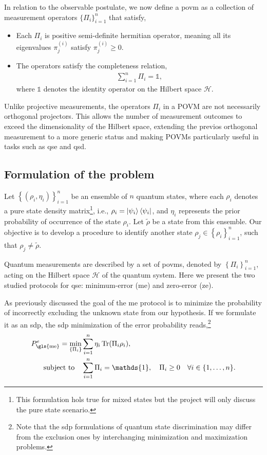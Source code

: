 \documentclass[12pt,letterpaper]{article}
\DeclareMathOperator{\tr}{Tr}
\begin{document}
In relation to the observable postulate, we now define a \gls{povm} as a collection of measurement operators $\{\Pi_i\}_{i=1}^n$ that satisfy,
\begin{itemize}
	\item Each $\Pi_i$ is positive semi-definite hermitian operator, meaning all its eigenvalues $\pi_j^{(i)}$ satisfy $\pi_j^{(i)} \geq 0$.
	\item The operators satisfy the completeness relation,
\begin{align*}
	\sum_{i=1}^n \Pi_i = \mathds{1},
\end{align*}
where $\mathds{1}$ denotes the identity operator on the Hilbert space $\mathcal{H}$.
\end{itemize}

Unlike projective measurements, the operators $\Pi_i$ in a POVM are not necessarily orthogonal projectors. This allows the number of measurement outcomes to exceed the dimensionality of the Hilbert space, extending the previos orthogonal measurement to a more generic status and making POVMs particularly useful in tasks such as \gls{qse} and \gls{qsd}.

\subsection{Formulation of the problem}\label{sectionFormulationOfTheProblem}

\hspace{20pt}Let $\left\{(\rho_i, \eta_i)\right\}_{i=1}^n$ be an ensemble of $n$ quantum states, where each $\rho_i$ denotes a pure state density matrix\footnote{This formulation hols true for mixed states but the project will only discuss the pure state scenario.}, i.e., $\rho_i = \ket{\psi_i}\bra{\psi_i}$, and $\eta_i$ represents the prior probability of occurrence of the state $\rho_i$. Let $\tilde{\rho}$ be a state from this ensemble. Our objective is to develop a procedure to identify another state $\rho_j \in \left\{\rho_i\right\}_{i=1}^n$, such that $\rho_j \neq \tilde{\rho}$.

Quantum measurements are described by a set of \glspl{povm}, denoted by $\left\{\Pi_i\right\}_{i=1}^n$, acting on the Hilbert space $\mathcal{H}$ of the quantum system. Here we present the two studied protocols for \gls{qse}: minimum-error (\gls{me}) and zero-error (\gls{ze}).

As previously discussed the goal of the \gls{me} protocol is to minimize the probability of incorrectly excluding the unknown state from our hypothesis. If we formulate it as an \gls{sdp}, the \gls{sdp} minimization of the error probability reads,\footnote{Note that the \gls{sdp} formulations of quantum state discrimination may differ from the exclusion ones by interchanging minimization and maximization problems.}
\begin{align*}
	P_{\text{\gls{me}}}^e = \min_{\left\{\Pi_i\right\}} &\sum_{i=1}^n \eta_i \tr(\Pi_i \rho_i),\\
	\text{subject to} \quad & \sum_{i=1}^n \Pi_i = \mathds{1}, \quad \Pi_i \geq 0 \quad \forall i \in \{1, \dots, n\}.
\end{align*}
\end{document}
